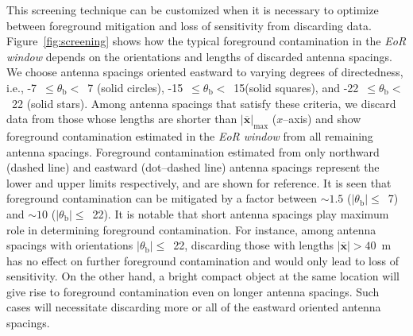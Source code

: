 \documentclass[preprint2,iop,numberedappendix]{emulateapj}
\begin{document}
This screening technique can be customized when it is necessary to optimize between foreground mitigation and loss of sensitivity from discarding data. Figure~\ref{fig:screening} shows how the typical foreground contamination in the {\it EoR window} depends on the orientations and lengths of discarded antenna spacings. We choose antenna spacings oriented eastward to varying degrees of directedness, i.e., -7~$\le\theta_\textrm{b}<$~7 (solid circles), -15\arcdeg~$\le\theta_\textrm{b}<$~15\arcdeg (solid squares), and -22~$\le\theta_\textrm{b}<$~22 (solid stars). Among antenna spacings that satisfy these criteria, we discard data from those whose lengths are shorter than $|\overline{\mathbf{x}}|_\textrm{max}$ ($x$--axis) and show foreground contamination estimated in the {\it EoR window} from all remaining antenna spacings. Foreground contamination estimated from only northward (dashed line) and eastward (dot--dashed line) antenna spacings represent the lower and upper limits respectively, and are shown for reference. It is seen that foreground contamination can be mitigated by a factor between $\sim 1.5$ ($|\theta_\textrm{b}|\le$~7) and $\sim 10$ ($|\theta_\textrm{b}|\le$~22). It is notable that short antenna spacings play maximum role in determining foreground contamination. For instance, among antenna spacings with orientations $|\theta_\textrm{b}|\le$~22, discarding those with lengths $|\overline{\mathbf{x}}|>40$~m has no effect on further foreground contamination and would only lead to loss of sensitivity. On the other hand, a bright compact object at the same location will give rise to foreground contamination even on longer antenna spacings. Such cases will necessitate discarding more or all of the eastward oriented antenna spacings.
\end{document}
